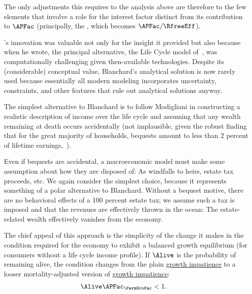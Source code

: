 \documentclass[\econtexRoot/BufferStockTheory]{subfiles}
\begin{document}
The only adjustments this requires to the analysis above are therefore to the few elements that involve a role for the interest factor distinct from its contribution to $\APFac$ (principally, the {\RIC}, which becomes $\APFac/\RfreeEff$).


\hypertarget{Modigliani-Lives}{}

\cite{blanchardFinite}'s innovation was valuable not only for the insight it provided but also because when he wrote, the principal alternative, the Life Cycle model of~\cite{modiglianiWealth}, was computationally challenging given then-available technologies.
Despite its (considerable) conceptual value, Blanchard's analytical solution is now rarely used because essentially all modern modeling incorporates uncertainty, constraints, and other features that rule out analytical solutions anyway.%

The simplest alternative to Blanchard is to follow Modigliani in constructing a realistic description of income over the life cycle and assuming that any wealth remaining at death occurs accidentally (not implausible, given the robust finding that for the great majority of households, bequests amount to less than 2 percent of lifetime earnings,~\cite{hendricksBequests,hendricksSmallBequests}).

Even if bequests are accidental, a macroeconomic model must make some assumption about how they are disposed of: As windfalls to heirs, estate tax proceeds, etc.
We again consider the simplest choice, because it represents something of a polar alternative to Blanchard.
Without a bequest motive, there are no behavioral effects of a 100 percent estate tax; we assume such a tax is imposed and that the revenues are effectively thrown in the ocean:  The estate-related wealth effectively vanishes from the economy.

The chief appeal of this approach is the simplicity of the change it makes in the condition required for the economy to exhibit a balanced growth equilibrium (for consumers without a life cycle income profile).
If $\Alive$ is the probability of remaining alive, the condition changes from the plain \hyperlink{GICRaw}{growth impatience} to a looser mortality-adjusted version of \hyperlink{GICRaw}{growth impatience}:
\hypertarget{GICLivModDefn}{}
\begin{equation}\begin{gathered}\begin{aligned}
  \Alive  \APFac_{\PermGroFac} & < 1. \label{eq:GICLivMod}
\end{aligned}\end{gathered}\end{equation}
\end{document}
